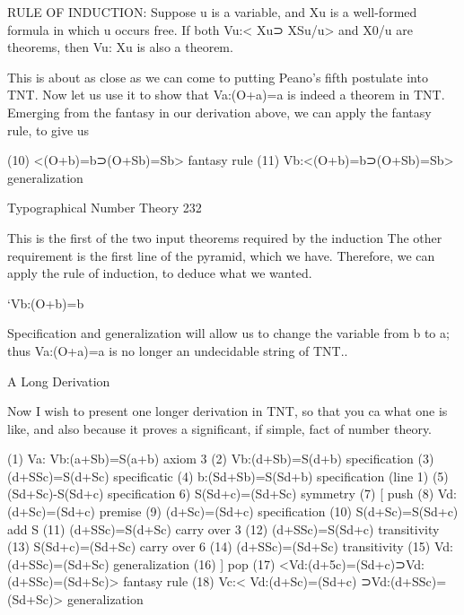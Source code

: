 RULE OF INDUCTION: Suppose u is a variable, and X{u} is a well-formed formula in
     which u occurs free. If both Vu:< X{u}⊃ X{Su/u}> and X{0/u} are theorems,
     then Vu: X{u} is also a theorem.

This is about as close as we can come to putting Peano's fifth postulate into TNT. Now
let us use it to show that Va:(O+a)=a is indeed a theorem in TNT. Emerging from the
fantasy in our derivation above, we can apply the fantasy rule, to give us

(10)   <(O+b)=b⊃(O+Sb)=Sb>                   fantasy rule
(11)   Vb:<(O+b)=b⊃(O+Sb)=Sb>                generalization


Typographical Number Theory                                                             232

This is the first of the two input theorems required by the induction The other
requirement is the first line of the pyramid, which we have. Therefore, we can apply the
rule of induction, to deduce what we wanted.

                                     `Vb:(O+b)=b

Specification and generalization will allow us to change the variable from b to a; thus
Va:(O+a)=a is no longer an undecidable string of TNT..

                                  A Long Derivation

Now I wish to present one longer derivation in TNT, so that you ca what one is like, and
also because it proves a significant, if simple, fact of number theory.

(1) Va: Vb:(a+Sb)=S(a+b)                                  axiom 3
(2) Vb:(d+Sb)=S(d+b)                                      specification
(3) (d+SSc)=S(d+Sc)                                       specificatic
(4) b:(Sd+Sb)=S(Sd+b)                                     specification (line 1)
(5) (Sd+Sc)-S(Sd+c)                                       specification
 6) S(Sd+c)=(Sd+Sc)                                       symmetry
(7) [                                                     push
(8)    Vd:(d+Sc)=(Sd+c)                                   premise
(9)    (d+Sc)=(Sd+c)                                      specification
(10) S(d+Sc)=S(Sd+c)                                      add S
(11) (d+SSc)=S(d+Sc)                                      carry over 3
(12) (d+SSc)=S(Sd+c)                                      transitivity
(13) S(Sd+c)=(Sd+Sc)                                      carry over 6
(14) (d+SSc)=(Sd+Sc)                                      transitivity
(15) Vd:(d+SSc)=(Sd+Sc)                                   generalization
(16) ]                                                    pop
(17) <Vd:(d+5c)=(Sd+c)⊃Vd:(d+SSc)=(Sd+Sc)>                fantasy rule
(18) Vc:< Vd:(d+Sc)=(Sd+c) ⊃Vd:(d+SSc)=(Sd+Sc)>           generalization

